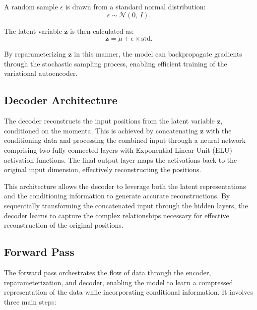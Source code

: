 \documentclass[11pt]{paper}
\begin{document}
A random sample $\epsilon$ is drawn from a standard normal distribution:
\begin{equation}
\epsilon \sim \mathcal{N}(0,\,I).
\label{eq:epsilon}
\end{equation}

The latent variable $\mathbf{z}$ is then calculated as:
\begin{equation}
\mathbf{z} = \mu + \epsilon \times \text{std}.
\label{eq:z}
\end{equation}

By reparameterizing $\mathbf{z}$ in this manner, the model can backpropagate gradients through the stochastic sampling process, enabling efficient training of the variational autoencoder.

\subsection{Decoder Architecture}

The decoder reconstructs the input positions from the latent variable $\mathbf{z}$, conditioned on the momenta. This is achieved by concatenating $\mathbf{z}$ with the conditioning data and processing the combined input through a neural network comprising two fully connected layers with Exponential Linear Unit (ELU) activation functions. The final output layer maps the activations back to the original input dimension, effectively reconstructing the positions.

This architecture allows the decoder to leverage both the latent representations and the conditioning information to generate accurate reconstructions. By sequentially transforming the concatenated input through the hidden layers, the decoder learns to capture the complex relationships necessary for effective reconstruction of the original positions.


\subsection{Forward Pass}

The forward pass orchestrates the flow of data through the encoder, reparameterization, and decoder, enabling the model to learn a compressed representation of the data while incorporating conditional information. It involves three main steps:
\end{document}
